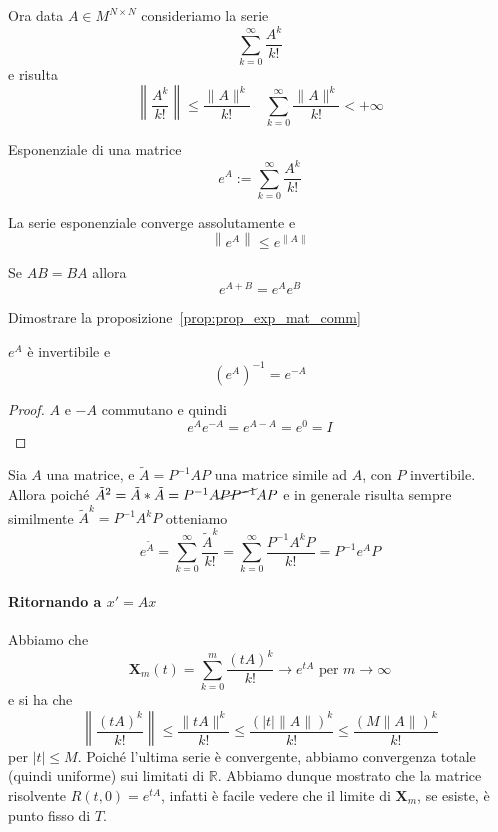 Ora data \(A \in M^{N\times N}\) consideriamo la serie
\[
  \sum_{k=0}^{\infty} \frac{A^{k}}{k!} 
\] e risulta
\[
  \left\| \frac{A^{k}}{k!}\right\| \le \frac{\|A\|^{k}}{k!} \quad
  \sum_{k=0}^{\infty} \frac{\|A\|^{k}}{k!} < +\infty 
\] 
\begin{definition}{Esponenziale di una matrice}
    \[
        e^{A} := \sum_{k=0}^{\infty} \frac{A^{k}}{k!}
    \]
\end{definition}

\begin{proposition}
    La serie esponenziale converge assolutamente e
    \[
      \left\|e^{A}\right\| \le e^{\|A\|}
    \]
\end{proposition}
\begin{proposition}\label{prop:prop_exp_mat_comm}
    Se \(AB = BA\) allora
    \[
      e^{A + B} = e^{A}e^{B}
    \]
\end{proposition}
\begin{eser}
    Dimostrare la proposizione~\ref{prop:prop_exp_mat_comm} 
\end{eser}
\begin{corollary}
    \(e^{A}\) è invertibile e 
    \[
      {\left( e^{A} \right)} ^{-1} = e^{-A}
    \]
\end{corollary}
\begin{proof}
    \(A\) e \(-A\) commutano e quindi
    \[
      e^{A}e^{-A} = e^{A-A} = e^{0} = I
    \]
\end{proof}

\begin{remark}
    Sia \(A\) una matrice, e \(\tilde{A} = P^{-1}AP\) una matrice simile ad
    \(A\), con \(P\) invertibile. Allora poiché \(\tilde{A}^2 =
    \tilde{A}*\tilde{A} = P^{-1} A \cancel{P P^{-1}} A P\) e in generale risulta
    sempre similmente \(\tilde{A}^{k} = P^{-1}A^{k}P\) otteniamo
    \[
      e^{\tilde{A}} = \sum_{k=0}^{\infty} \frac{\tilde{A}^{k}}{k!} =
      \sum_{k=0}^{\infty} \frac{P^{-1}A^{k} P}{k!} = P^{-1}e^{A}P
    \] 
\end{remark}

\paragraph{Ritornando a \(x'= Ax\) }\label{ritorniamo_a_noi_dopo_exp_matr}
Abbiamo che
\[
  \mathbf{X}_{m} {(t)} = \sum_{k=0}^{m} \frac{{\left( tA \right)} ^{k}}{k!} \to
  e^{tA} \text{ per } m \to \infty
\]
e si ha che
\[
  \left\|\frac{{(tA)}^{k}}{k!}\right\| \le \frac{\|tA\|^{k}}{k!} \le
  \frac{{\left( |t|\|A\| \right)}^{k} }{ k! } \le \frac{{\left( M\|A\| \right)}
  ^{k}}{k!}
\]
per \(|t| \le M\). Poiché l'ultima serie è convergente, abbiamo convergenza
totale (quindi uniforme) sui limitati di \(\mathbb{R}\). Abbiamo dunque
mostrato che la matrice risolvente \(R {(t, 0)} = e^{tA}\), infatti è facile
vedere che il limite di \(\mathbf{X}_m\), se esiste, è punto fisso di \(T\).

